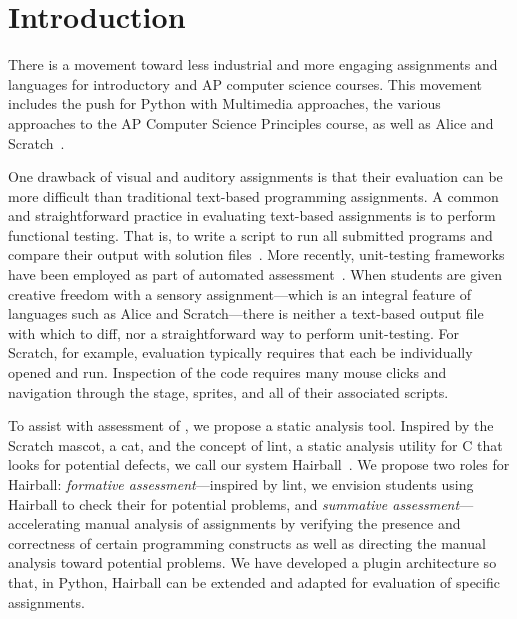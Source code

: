 \section{Introduction}
There is a movement toward less industrial and more engaging assignments and
languages for introductory and AP computer science courses.  This movement
includes the push for Python with Multimedia approaches, the various approaches
to the AP Computer Science Principles course, as well as Alice and
Scratch~\cite{Adams:2012:SLP:2157136.2157319, Forte:2004:CCC:962752.962945,
  Simon:2010:ERC:1822090.1822151, Snyder:2012:FFC:2189835.2189852,
  Cooper:2003:TOI:611892.611966, Maloney:2010:SPL:1868358.1868363}.

One drawback of visual and auditory assignments is that their evaluation can be
more difficult than traditional text-based programming assignments.  A common
and straightforward practice in evaluating text-based assignments is to perform
functional testing. That is, to write a script to run all submitted programs
and compare their output with solution
files~\cite{Jackson:1997:GSP:268084.268210}.  More recently, unit-testing
frameworks have been employed as part of automated
assessment~\cite{Spacco:2006:EMD:1140124.1140131,
  Edwards:2003:RCS:949344.949390}.  When students are given creative freedom
with a sensory assignment---which is an integral feature of languages such as
Alice and Scratch---there is neither a text-based output file with which to
diff, nor a straightforward way to perform unit-testing.  For Scratch, for
example, evaluation typically requires that each \sprogram{} be individually
opened and run.  Inspection of the code requires many mouse clicks and
navigation through the stage, sprites, and all of their associated scripts.

To assist with assessment of , we propose a static analysis tool.
Inspired by the Scratch mascot, a cat, and the concept of lint, a static
analysis utility for C that looks for potential defects, we call our system
Hairball~\cite{Johnson78lint}. We propose two roles for Hairball:
\emph{formative assessment}---inspired by lint, we envision students using
Hairball to check their  for potential problems, and
\emph{summative assessment}---accelerating manual analysis of assignments by
verifying the presence and correctness of certain programming constructs as
well as directing the manual analysis toward potential problems.  We have
developed a plugin architecture so that, in Python, Hairball can be extended
and adapted for evaluation of specific assignments.

